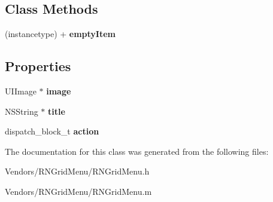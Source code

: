 \subsection*{Class Methods}
\begin{DoxyCompactItemize}
\item 
\hypertarget{interface_r_n_grid_menu_item_ab4ebfe805e9c0f5a249aec685f9ad064}{}(instancetype) + {\bfseries empty\+Item}\label{interface_r_n_grid_menu_item_ab4ebfe805e9c0f5a249aec685f9ad064}

\end{DoxyCompactItemize}
\subsection*{Properties}
\begin{DoxyCompactItemize}
\item 
\hypertarget{interface_r_n_grid_menu_item_a5149b73f354a371f3d52aaa8c485a9ca}{}U\+I\+Image $\ast$ {\bfseries image}\label{interface_r_n_grid_menu_item_a5149b73f354a371f3d52aaa8c485a9ca}

\item 
\hypertarget{interface_r_n_grid_menu_item_a3eac26ccdd005d4858f1498ede039972}{}N\+S\+String $\ast$ {\bfseries title}\label{interface_r_n_grid_menu_item_a3eac26ccdd005d4858f1498ede039972}

\item 
\hypertarget{interface_r_n_grid_menu_item_a30d65bd1f45a28012bf02bc89a6cea6e}{}dispatch\+\_\+block\+\_\+t {\bfseries action}\label{interface_r_n_grid_menu_item_a30d65bd1f45a28012bf02bc89a6cea6e}

\end{DoxyCompactItemize}


The documentation for this class was generated from the following files\+:\begin{DoxyCompactItemize}
\item 
Vendors/\+R\+N\+Grid\+Menu/R\+N\+Grid\+Menu.\+h\item 
Vendors/\+R\+N\+Grid\+Menu/R\+N\+Grid\+Menu.\+m\end{DoxyCompactItemize}
